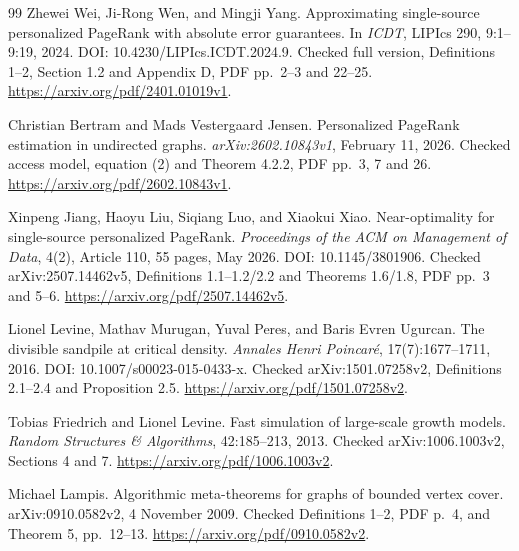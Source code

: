 \begin{thebibliography}{99}
Zhewei Wei, Ji-Rong Wen, and Mingji Yang.
\newblock Approximating single-source personalized PageRank with absolute
error guarantees.
\newblock In \emph{ICDT}, LIPIcs 290, 9:1--9:19, 2024.
\newblock DOI: 10.4230/LIPIcs.ICDT.2024.9. Checked full version,
Definitions 1--2, Section 1.2 and Appendix D, PDF pp.\ 2--3 and 22--25.
\newblock \url{https://arxiv.org/pdf/2401.01019v1}.

Christian Bertram and Mads Vestergaard Jensen.
\newblock Personalized PageRank estimation in undirected graphs.
\newblock \emph{arXiv:2602.10843v1}, February 11, 2026.
\newblock Checked access model, equation (2) and Theorem 4.2.2,
PDF pp.\ 3, 7 and 26. \url{https://arxiv.org/pdf/2602.10843v1}.

Xinpeng Jiang, Haoyu Liu, Siqiang Luo, and Xiaokui Xiao.
\newblock Near-optimality for single-source personalized PageRank.
\newblock \emph{Proceedings of the ACM on Management of Data},
4(2), Article 110, 55 pages, May 2026. DOI: 10.1145/3801906.
\newblock Checked arXiv:2507.14462v5, Definitions 1.1--1.2/2.2 and
Theorems 1.6/1.8, PDF pp.\ 3 and 5--6.
\newblock \url{https://arxiv.org/pdf/2507.14462v5}.

Lionel Levine, Mathav Murugan, Yuval Peres, and Baris Evren Ugurcan.
\newblock The divisible sandpile at critical density.
\newblock \emph{Annales Henri Poincar\'e}, 17(7):1677--1711, 2016.
\newblock DOI: 10.1007/s00023-015-0433-x.
Checked arXiv:1501.07258v2, Definitions 2.1--2.4 and Proposition 2.5.
\newblock \url{https://arxiv.org/pdf/1501.07258v2}.

Tobias Friedrich and Lionel Levine.
\newblock Fast simulation of large-scale growth models.
\newblock \emph{Random Structures \& Algorithms}, 42:185--213, 2013.
\newblock Checked arXiv:1006.1003v2, Sections 4 and 7.
\newblock \url{https://arxiv.org/pdf/1006.1003v2}.

Michael Lampis.
\newblock Algorithmic meta-theorems for graphs of bounded vertex cover.
\newblock arXiv:0910.0582v2, 4 November 2009.
\newblock Checked Definitions 1--2, PDF p.\ 4, and Theorem 5, pp.\ 12--13.
\newblock \url{https://arxiv.org/pdf/0910.0582v2}.

\end{thebibliography}

